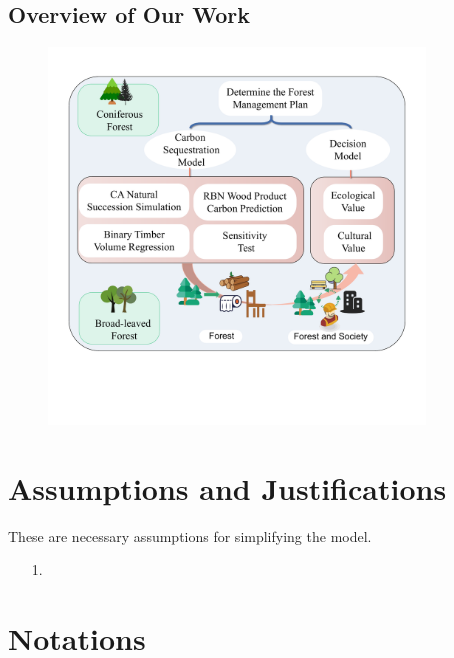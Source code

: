 \documentclass{mcmthesis}
\numberwithin{figure}{section}
\numberwithin{table}{section}
\numberwithin{equation}{section}
\begin{document}
\subsection{Overview of Our Work}

\begin{figure}[htbp]
  \centering
  \includegraphics[width = 10cm]{code&pic/框架图.pdf}
\end{figure}


\section{Assumptions and Justifications}
These are necessary assumptions for simplifying the model.
\begin{enumerate}
  \item [1.] 
\end{enumerate}

\newpage

\section{Notations}

\renewcommand\arraystretch{1.5}
\end{document}
